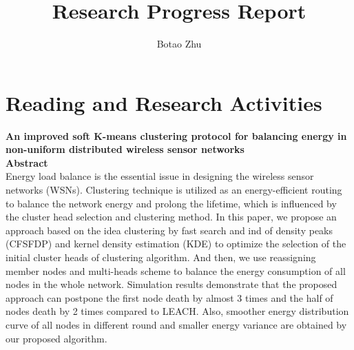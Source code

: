 \documentclass[11pt]{report}
\title{Research Progress Report}
\author{Botao Zhu}
\begin{document}
	
	\maketitle
	 \chead{} 
	 \cfoot{} 
	\renewcommand{\footrulewidth}{1.0pt}
	\renewcommand{\headrulewidth}{2.0pt}
	\renewcommand{\arraystretch}{1.3}
	\pagestyle{fancy}
	
	\renewcommand{\thesection}{\arabic{section}}
	
	\section{Reading and Research Activities}
 
	


	\textbf{An improved soft K-means clustering protocol for balancing energy in non-uniform distributed wireless sensor networks}\\
	
    \noindent \textbf{Abstract} \\
    Energy load balance is the essential issue in designing the wireless sensor networks (WSNs). Clustering technique is utilized as an energy-efficient routing to balance the network energy and prolong the lifetime, which is influenced by the cluster head selection and clustering method. In this paper, we propose an approach based on the idea clustering by fast search and ind of density peaks (CFSFDP) and kernel density estimation (KDE) to optimize the selection of the initial cluster heads of clustering algorithm. And then, we use reassigning member nodes and multi-heads scheme to balance the energy consumption of all nodes in the whole network. Simulation results demonstrate that the proposed approach can postpone the first node death by almost 3 times and the half of nodes death by 2 times compared to LEACH. Also, smoother energy distribution curve of all nodes in different round and smaller energy variance are obtained by our proposed algorithm.
	
\end{document}
